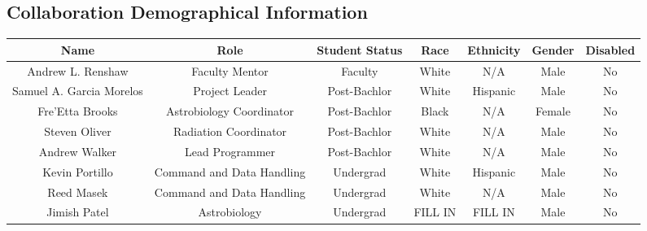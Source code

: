 \begin{appendices}
  \section{Collaboration Demographical Information}

  \begin{table}[h!]
    \def\arraystretch{1.4}  %
    \centering  
    \begin{tabular}  {c c c c c c c}
      \textbf{Name} &  \textbf{Role} & \textbf{Student Status} & \textbf{Race} & \textbf{Ethnicity} & \textbf{Gender} & \textbf{Disabled}\\
      \hline
      \hline
      Andrew L. Renshaw & Faculty Mentor & Faculty & White & N/A & Male & No\\
      Samuel A. Garcia Morelos & Project Leader & Post-Bachlor & White & Hispanic & Male & No\\
      Fre'Etta Brooks & Astrobiology Coordinator & Post-Bachlor & Black & N/A & Female & No\\
      Steven Oliver & Radiation Coordinator & Post-Bachlor & White & N/A & Male & No\\
      Andrew Walker & Lead Programmer & Post-Bachlor & White & N/A & Male & No\\
      Kevin Portillo & Command and Data Handling & Undergrad & White & Hispanic & Male & No \\
      Reed Masek & Command and Data Handling & Undergrad & White & N/A & Male & No\\
      Jimish Patel & Astrobiology & Undergrad & FILL IN & FILL IN & Male & No \\
      \hline
    \end{tabular}	
  \end{table}  
  
\end{appendices}

